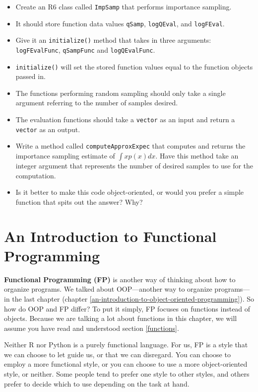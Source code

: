 \documentclass[12pt,krantz2]{krantz}
\providecommand{\tightlist}{%
  \setlength{\itemsep}{0pt}\setlength{\parskip}{0pt}}
\begin{document}
\begin{itemize}
\tightlist
\item
  Create an R6 class called \texttt{ImpSamp} that performs importance sampling.
\item
  It should store function data values \texttt{qSamp}, \texttt{logQEval}, and \texttt{logFEval}.
\item
  Give it an \texttt{initialize()} method that takes in three arguments: \texttt{logFEvalFunc}, \texttt{qSampFunc} and \texttt{logQEvalFunc}.
\item
  \texttt{initialize()} will set the stored function values equal to the function objects passed in.
\item
  The functions performing random sampling should only take a single argument referring to the number of samples desired.
\item
  The evaluation functions should take a \texttt{vector} as an input and return a \texttt{vector} as an output.
\item
  Write a method called \texttt{computeApproxExpec} that computes and returns the importance sampling estimate of \(\int x p(x) dx\). Have this method take an integer argument that represents the number of desired samples to use for the computation.
\item
  Is it better to make this code object-oriented, or would you prefer a simple function that spits out the answer? Why?
\end{itemize}

\hypertarget{an-introduction-to-functional-programming}{%
\chapter{An Introduction to Functional Programming}\label{an-introduction-to-functional-programming}}

\textbf{Functional Programming (FP)} is another way of thinking about how to organize programs. We talked about OOP---another way to organize programs---in the last chapter (chapter \ref{an-introduction-to-object-oriented-programming}). So how do OOP and FP differ? To put it simply, FP focuses on functions instead of objects. Because we are talking a lot about functions in this chapter, we will assume you have read and understood section \ref{functions}.

Neither R nor Python is a purely functional language. For us, FP is a style that we can choose to let guide us, or that we can disregard. You can choose to employ a more functional style, or you can choose to use a more object-oriented style, or neither. Some people tend to prefer one style to other styles, and others prefer to decide which to use depending on the task at hand.
\end{document}
